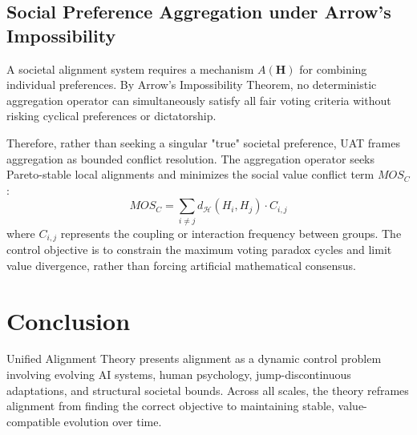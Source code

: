 \documentclass[11pt]{article}
\begin{document}
\subsection{Social Preference Aggregation under Arrow's Impossibility}
A societal alignment system requires a mechanism $A(\mathbf H)$ for combining individual preferences. By Arrow's Impossibility Theorem, no deterministic aggregation operator can simultaneously satisfy all fair voting criteria without risking cyclical preferences or dictatorship. 

Therefore, rather than seeking a singular "true" societal preference, UAT frames aggregation as bounded conflict resolution. The aggregation operator seeks Pareto-stable local alignments and minimizes the social value conflict term $MOS_C$:
\[
MOS_C = \sum_{i \neq j} d_{\mathcal{H}}(H_i, H_j) \cdot C_{i,j}
\]
where $C_{i,j}$ represents the coupling or interaction frequency between groups. The control objective is to constrain the maximum voting paradox cycles and limit value divergence, rather than forcing artificial mathematical consensus.

\section{Conclusion}
Unified Alignment Theory presents alignment as a dynamic control problem involving evolving AI systems, human psychology, jump-discontinuous adaptations, and structural societal bounds. Across all scales, the theory reframes alignment from finding the correct objective to maintaining stable, value-compatible evolution over time.
\end{document}
